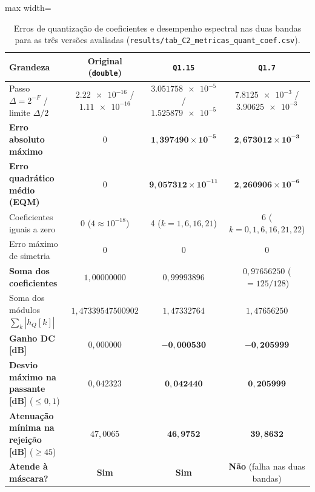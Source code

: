 \documentclass[11pt,a4paper]{article}
\newcommand{\MetricaCErroMaxQXV}{1{,}397490\times 10^{-5}}
\newcommand{\MetricaCEQMQXV}{9{,}057312\times 10^{-11}}
\newcommand{\MetricaCSomaQXV}{0{,}99993896}
\newcommand{\MetricaCGanhoDCQXVdB}{-0{,}000530}
\newcommand{\MetricaCDesvioPassQXVdB}{0{,}042440}
\newcommand{\MetricaCAtenStopQXVdB}{46{,}9752}
\newcommand{\MetricaCErroMaxQVII}{2{,}673012\times 10^{-3}}
\newcommand{\MetricaCEQMQVII}{2{,}260906\times 10^{-6}}
\newcommand{\MetricaCSomaQVII}{0{,}97656250}
\newcommand{\MetricaCGanhoDCQVIIdB}{-0{,}205999}
\newcommand{\MetricaCDesvioPassQVIIdB}{0{,}205999}
\newcommand{\MetricaCAtenStopQVIIdB}{39{,}8632}
\newcommand{\MetricaCSomaAbsQXV}{1{,}47332764}
\newcommand{\MetricaCSomaAbsQVII}{1{,}47656250}
\newcommand{\MetricaENormaLI}{1{,}47339547500902}
\begin{document}
\begin{table}[!htbp]
    \centering
    \caption{Erros de quantização de coeficientes e desempenho espectral nas duas bandas para as três versões avaliadas (\texttt{results/\allowbreak tab\_C2\_\allowbreak metricas\_quant\_coef.csv}).}
    \label{tab:C2_metricas}
    \small
    \setlength{\tabcolsep}{5pt}
    \begin{adjustbox}{max width=\textwidth}
    \begin{tabular}{@{}lccc@{}}
        \toprule
        \textbf{Grandeza} & \textbf{Original (\texttt{double})} & \textbf{\texttt{Q1.15}} & \textbf{\texttt{Q1.7}} \\
        \midrule
        Passo $\Delta = 2^{-F}$ / limite $\Delta/2$ & $\num{2,22e-16}$ / $\num{1,11e-16}$ & $\num{3,051758e-5}$ / $\num{1,525879e-5}$ & $\num{7,8125e-3}$ / $\num{3,90625e-3}$ \\
        \textbf{Erro absoluto máximo} & $0$ & $\mathbf{\MetricaCErroMaxQXV}$ & $\mathbf{\MetricaCErroMaxQVII}$ \\
        \textbf{Erro quadrático médio (EQM)} & $0$ & $\mathbf{\MetricaCEQMQXV}$ & $\mathbf{\MetricaCEQMQVII}$ \\
        Coeficientes iguais a zero & $0$ ($4 \approx 10^{-18}$) & 4 ($k = 1, 6, 16, 21$) & 6 ($k = 0, 1, 6, 16, 21, 22$) \\
        Erro máximo de simetria & $0$ & $0$ & $0$ \\
        \textbf{Soma dos coeficientes} & $1,00000000$ & $\MetricaCSomaQXV$ & $\MetricaCSomaQVII$ ($= 125/128$) \\
        Soma dos módulos $\sum_k |h_Q[k]|$ & $\MetricaENormaLI$ & $\MetricaCSomaAbsQXV$ & $\MetricaCSomaAbsQVII$ \\
        \textbf{Ganho DC [\si{dB}]} & $0,000000$ & $\mathbf{\MetricaCGanhoDCQXVdB}$ & $\mathbf{\MetricaCGanhoDCQVIIdB}$ \\
        \textbf{Desvio máximo na passante [\si{dB}]} ($\le 0,1$) & $0,042323$ & $\mathbf{\MetricaCDesvioPassQXVdB}$ & $\mathbf{\MetricaCDesvioPassQVIIdB}$ \\
        \textbf{Atenuação mínima na rejeição [\si{dB}]} ($\ge 45$) & $47,0065$ & $\mathbf{\MetricaCAtenStopQXVdB}$ & $\mathbf{\MetricaCAtenStopQVIIdB}$ \\
        \textbf{Atende à máscara?} & \textbf{Sim} & \textbf{Sim} & \textbf{Não} (falha nas duas bandas) \\
        \bottomrule
    \end{tabular}
    \end{adjustbox}
\end{table}
\end{document}
